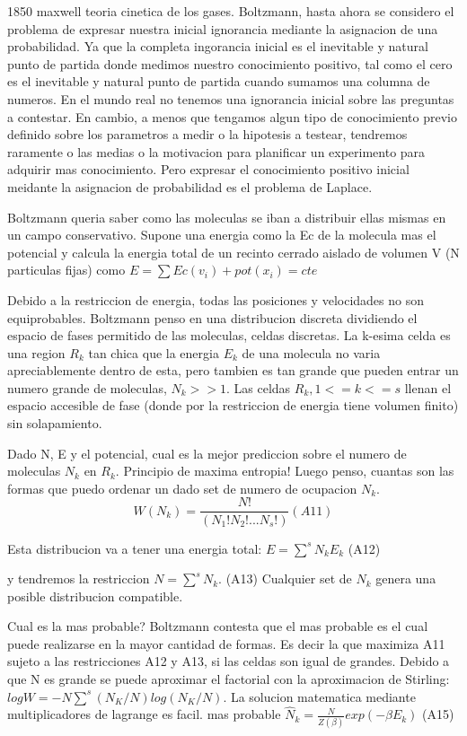 \documentclass[20pt]{extarticle}
\begin{document}
1850 maxwell teoria cinetica de los gases.
Boltzmann, hasta ahora se considero el problema de expresar nuestra inicial ignorancia mediante la asignacion de una probabilidad.
Ya que la completa ingorancia inicial es el inevitable y natural punto de partida donde medimos nuestro conocimiento positivo, tal como el cero es el inevitable y natural punto de partida cuando sumamos una columna de numeros.
En el mundo real no tenemos una ignorancia inicial sobre las preguntas a contestar.
En cambio, a menos que tengamos algun tipo de conocimiento previo definido sobre los parametros a medir o la hipotesis a testear, tendremos raramente o las medias o la motivacion para planificar un experimento para adquirir mas conocimiento.
Pero expresar el conocimiento positivo inicial meidante la asignacion de probabilidad es el problema de Laplace.

Boltzmann queria saber como las moleculas se iban a distribuir ellas mismas en un campo conservativo.
Supone una energia como la Ec de la molecula mas el potencial y calcula la energia total de un recinto cerrado aislado de volumen V (N particulas fijas)
como $E=\sum Ec(v_i) + pot(x_i) = cte$

Debido a la restriccion de energia, todas las posiciones y velocidades no son equiprobables.
Boltzmann penso en una distribucion discreta dividiendo el espacio de fases permitido de las moleculas, celdas discretas.
La k-esima celda es una region $R_k$ tan chica que la energia $E_k$ de una molecula no varia apreciablemente dentro de esta, pero tambien es tan grande que pueden entrar un numero grande de moleculas, $N_k >> 1$.
Las celdas ${R_k, 1 <= k <= s}$ llenan el espacio accesible de fase (donde por la restriccion de energia tiene volumen finito) sin solapamiento.

Dado N, E y el potencial, cual es la mejor prediccion sobre el numero de moleculas $N_k$ en $R_k$. Principio de maxima entropia!
Luego penso, cuantas son las formas que puedo ordenar un dado set de numero de ocupacion $N_k$.
\begin{equation}
	W(N_k)= \frac{N!}{(N_1!N_2!...N_s!)} (A11)
\end{equation}

Esta distribucion va a tener una energia total: $E=\sum^s N_k E_k$ (A12)

y tendremos la restriccion $N = \sum^s N_k$. (A13)
Cualquier set de ${N_k}$ genera una posible distribucion compatible.

Cual es la mas probable? Boltzmann contesta que el mas probable es el cual puede realizarse en la mayor cantidad de formas. Es decir  la que maximiza A11 sujeto a las restricciones  A12  y A13, si las celdas son igual de grandes.
Debido a que N es grande se puede aproximar el factorial con la aproximacion de Stirling:
$log W = -N \sum^s (N_K/N) log(N_K/N)$.
La solucion matematica mediante multiplicadores de lagrange es facil.
mas probable $\hat{N}_k = \frac{N}{Z(\beta)} exp(-\beta E_k)$ (A15)
\end{document}

